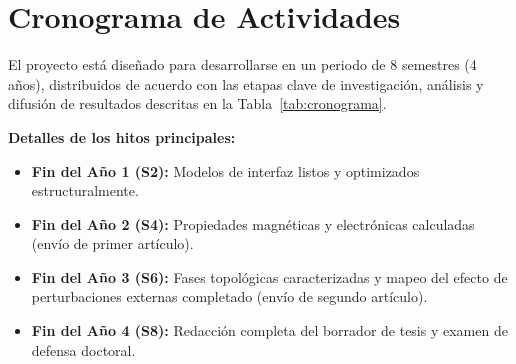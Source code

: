 \section{Cronograma de Actividades}
\label{sec:cronograma}

El proyecto está diseñado para desarrollarse en un periodo de 8 semestres (4 años), distribuidos de acuerdo con las etapas clave de investigación, análisis y difusión de resultados descritas en la Tabla~\ref{tab:cronograma}.

\begin{table}[htbp]
    \centering
    \caption{Cronograma semestral de actividades del proyecto de investigación doctoral.}
    \label{tab:cronograma}
\end{table}

\noindent \textbf{Detalles de los hitos principales:}
\begin{itemize}
    \item \textbf{Fin del Año 1 (S2):} Modelos de interfaz listos y optimizados estructuralmente.
    \item \textbf{Fin del Año 2 (S4):} Propiedades magnéticas y electrónicas calculadas (envío de primer artículo).
    \item \textbf{Fin del Año 3 (S6):} Fases topológicas caracterizadas y mapeo del efecto de perturbaciones externas completado (envío de segundo artículo).
    \item \textbf{Fin del Año 4 (S8):} Redacción completa del borrador de tesis y examen de defensa doctoral.
\end{itemize}
